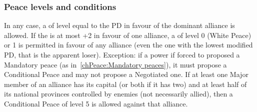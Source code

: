 \subsubsection{Peace levels and conditions}
\bparag In any case, a  of level equal to the PD in
favour of the dominant alliance is
allowed. %
\bparag If the  is at most +2 in favour of one
alliance, a  of level 0 (White Peace) or 1 is
permitted in favour of any alliance (even the one with the lowest modified PD,
that is the apparent loser).
\bparag Exception: if a power if forced to proposed a Mandatory peace (as
in~\ref{chPeace:Mandatory peaces}), it must propose a Conditional Peace and
may not propose a Negotiated one.
\bparag If at least one Major member of an alliance has its capital (or both
if it has two) and at least half of its national provinces controlled by
enemies (not necessarily allied), then a Conditional Peace of level 5 is
allowed against that alliance.


